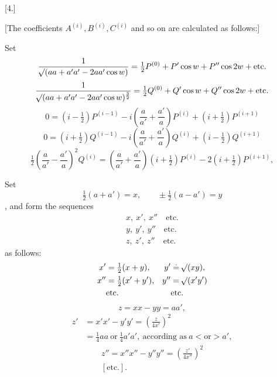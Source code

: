 \par\bigskip
\hypertarget{native-390}{}
\begin{center}[4.]\end{center}
\noindent\hspace*{\parindent}[The coefficients \(A^{(i)}, B^{(i)}, C^{(i)}\) and so on are calculated as follows:]

Set
\[
\frac{1}{\mathord{{}^{}\!\surd}(aa+a'a'-2aa'\cos w)}=\tfrac12P^{(0)}+P'\cos w+P''\cos2w+\text{etc.}
\]
\[
\frac{1}{\mathord{{}^{}\!\surd}(aa+a'a'-2aa'\cos w)^{\frac32}}=\tfrac12Q^{(0)}+Q'\cos w+Q''\cos2w+\text{etc.}
\]
\[
0=(i-\tfrac12)P^{(i-1)}-i\left(\frac a{a'}+\frac{a'}a\right)P^{(i)}+(i+\tfrac12)P^{(i+1)}
\]
\[
0=(i+\tfrac12)Q^{(i-1)}-i\left(\frac a{a'}+\frac{a'}a\right)Q^{(i)}+(i-\tfrac12)Q^{(i+1)}
\]
\[
\tfrac12\left(\frac a{a'}-\frac{a'}a\right)^2Q^{(i)}=\left(\frac a{a'}+\frac{a'}a\right)(i+\tfrac12)P^{(i)}-2(i+\tfrac12)P^{(i+1)},
\]

Set
\[
\tfrac12(a+a')=x,\qquad\pm\tfrac12(a-a')=y
\]
, and form the sequences
\[
\begin{gathered}
x,\ x',\ x''\quad\text{etc.}\\
y,\ y',\ y''\quad\text{etc.}\\
z,\ z',\ z''\quad\text{etc.}
\end{gathered}
\]
\noindent as follows:
\[
\begin{aligned}
x'&=\tfrac12(x+y),&y'&\overset{\scriptscriptstyle\boldsymbol{.}}{=}\mathord{{}^{}\!\surd}(xy),\\
x''&=\tfrac12(x'+y'),&y''&=\mathord{{}^{}\!\surd}(x'y')\\
&\text{etc.}&&\text{etc.}
\end{aligned}
\]
\[
z=xx-yy=aa',
\]
\[
\begin{aligned}
z'&=x'x'-y'y'=\left(\frac z{4x'}\right)^2\\
&=\tfrac14aa\ \text{or}\ \tfrac14a'a',\ \text{according as}\ a<\text{or}>a',
\end{aligned}
\]
\[
\begin{gathered}
z''=x''x''-y''y''=\left(\frac{z'}{4x''}\right)^2\\
[\text{etc.}].
\end{gathered}
\]

